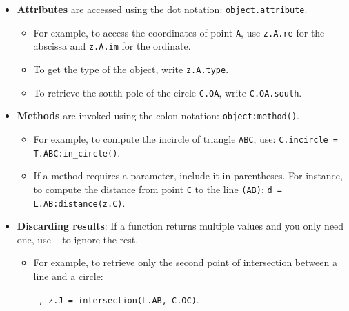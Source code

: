 \begin{itemize}
  \item \textbf{Attributes} are accessed using the dot notation: \verb|object.attribute|.
    \begin{itemize}
      \item For example, to access the coordinates of point \verb|A|, use \verb|z.A.re| for the abscissa and \verb|z.A.im| for the ordinate.
      \item To get the type of the object, write \verb|z.A.type|.
      \item To retrieve the south pole of the circle \verb|C.OA|, write \verb|C.OA.south|.
    \end{itemize}

  \item \textbf{Methods} are invoked using the colon notation: \verb|object:method()|.
    \begin{itemize}
      \item For example, to compute the incircle of triangle \verb|ABC|, use: \verb|C.incircle = T.ABC:in_circle()|.
      \item If a method requires a parameter, include it in parentheses. For instance, to compute the distance from point \verb|C| to the line \verb|(AB)|: \verb|d = L.AB:distance(z.C)|.
    \end{itemize}

  \item \textbf{Discarding results}: If a function returns multiple values and you only need one, use \verb|_| to ignore the rest.
    \begin{itemize}
      \item For example, to retrieve only the second point of intersection between a line and a circle:

      \verb|_, z.J = intersection(L.AB, C.OC)|.
    \end{itemize}
\end{itemize}

